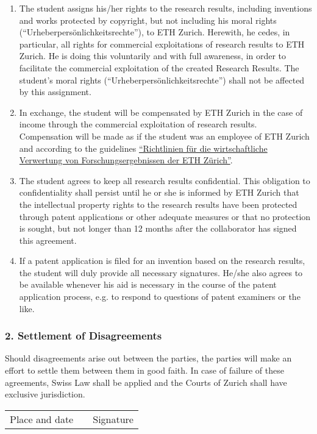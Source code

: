 \begin{enumerate}[topsep=0pt,itemsep=0ex,partopsep=1ex,parsep=1ex]
\item The student assigns his/her rights to the research results, including inventions and works protected by copyright, but not including his moral rights (“Urheberpers\"onlichkeitsrechte”), to ETH Zurich. Herewith, he cedes, in particular, all rights for commercial exploitations of research results to ETH Zurich. He is doing this voluntarily and with full awareness, in order to facilitate the commercial exploitation of the created Research Results. The student's moral rights (“Urheberpers\"onlichkeitsrechte”) shall not be affected by this assignment.

\item	In exchange, the student will be compensated by ETH Zurich in the case of income through the commercial exploitation of research results. Compensation will be made as if the student was an employee of ETH Zurich and according to the guidelines  \href{https://rechtssammlung.sp.ethz.ch/Dokumente/440.4.pdf?Web=1}{“Richtlinien f\"ur die wirtschaftliche Verwertung von Forschungsergebnissen der ETH Z\"urich”}.

\item	The student agrees to keep all research results confidential. This obligation to confidentiality shall persist until he or she is informed by ETH Zurich that the intellectual property rights to the research results have been protected through patent applications or other adequate measures or that no protection is sought, but not longer than 12 months after the collaborator has signed this agreement.

\item If a patent application is filed for an invention based on the research results, the student will duly provide all necessary signatures. He/she also agrees to be available whenever his aid is necessary in the course of the patent application process, e.g. to respond to questions of patent examiners or the like. 

\end{enumerate}

\subsubsection{2. Settlement of Disagreements}

Should disagreements arise out between the parties, the parties will make an effort to settle them between them in good faith.
In case of failure of these agreements, Swiss Law shall be applied and the Courts of Zurich shall have exclusive jurisdiction.



\vspace{3cm}

\begin{tabular}{ p{5cm} p{1cm} p{5cm} }
  \cline{1-1} \cline{3-3}
  Place and date & & Signature \\
\end{tabular}
